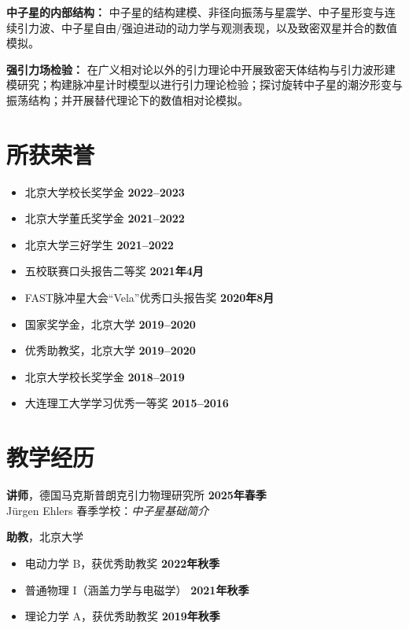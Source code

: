 \documentclass[margin,line]{res_mod}
\begin{document}
\begin{resume}
\textbf{中子星的内部结构：} 中子星的结构建模、非径向振荡与星震学、中子星形变与连续引力波、中子星自由/强迫进动的动力学与观测表现，以及致密双星并合的数值模拟。

\textbf{强引力场检验：} 在广义相对论以外的引力理论中开展致密天体结构与引力波形建模研究；构建脉冲星计时模型以进行引力理论检验；探讨旋转中子星的潮汐形变与振荡结构；并开展替代理论下的数值相对论模拟。

\section{所获荣誉}
\begin{itemize}
  \item 北京大学校长奖学金 \hfill \textbf{2022–2023}
  \item 北京大学董氏奖学金 \hfill \textbf{2021–2022}
  \item 北京大学三好学生 \hfill \textbf{2021–2022}
  \item 五校联赛口头报告二等奖 \hfill \textbf{2021年4月}
  \item FAST脉冲星大会“Vela”优秀口头报告奖 \hfill \textbf{2020年8月}
  \item 国家奖学金，北京大学 \hfill \textbf{2019–2020}
  \item 优秀助教奖，北京大学 \hfill \textbf{2019–2020}
  \item 北京大学校长奖学金 \hfill \textbf{2018–2019}
  \item 大连理工大学学习优秀一等奖 \hfill \textbf{2015–2016}
\end{itemize}


\section{教学经历}

\textbf{讲师}，德国马克斯普朗克引力物理研究所 \hfill \textbf{2025年春季} \\
Jürgen Ehlers 春季学校：\textit{中子星基础简介}

\vspace{0.8em}

\textbf{助教}，北京大学
\begin{itemize}
  \item 电动力学 B，获优秀助教奖 \hfill \textbf{2022年秋季}
  \item 普通物理 I（涵盖力学与电磁学） \hfill \textbf{2021年秋季}
  \item 理论力学 A，获优秀助教奖 \hfill \textbf{2019年秋季}
\end{itemize}




\end{resume}
\end{document}
